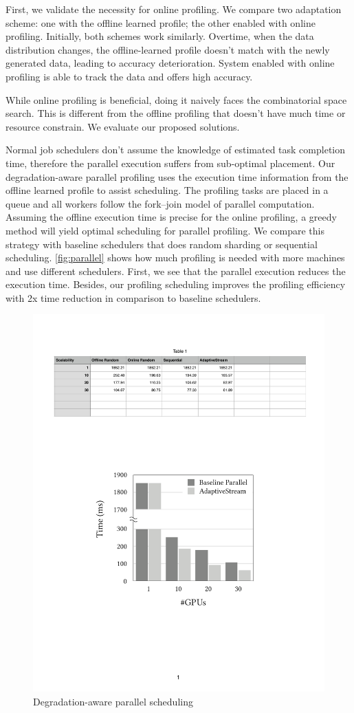 First, we validate the necessity for online profiling. We compare two adaptation
scheme: one with the offline learned profile; the other enabled with online
profiling. Initially, both schemes work similarly. Overtime, when the data
distribution changes, the offline-learned profile doesn't match with the newly
generated data, leading to accuracy deterioration. System enabled with online
profiling is able to track the data and offers high accuracy.

While online profiling is beneficial, doing it naively faces the combinatorial
space search. This is different from the offline profiling that doesn't have
much time or resource constrain. We evaluate our proposed solutions.

 Normal job schedulers don't assume
the knowledge of estimated task completion time, therefore the parallel
execution suffers from sub-optimal placement. Our degradation-aware parallel
profiling uses the execution time information from the offline learned profile
to assist scheduling. The profiling tasks are placed in a queue and all workers
follow the fork–join model of parallel computation. Assuming the offline
execution time is precise for the online profiling, a greedy method will yield
optimal scheduling for parallel profiling. We compare this strategy with
baseline schedulers that does random sharding or sequential scheduling.
\autoref{fig:parallel} shows how much profiling is needed with more machines and
use different schedulers. First, we see that the parallel execution reduces the
execution time. Besides, our profiling scheduling improves the profiling
efficiency with 2x time reduction in comparison to baseline schedulers.

\begin{figure}
  \centering
  \includegraphics[width=0.8\columnwidth]{figures/parallel.pdf}
  \caption{Degradation-aware parallel scheduling}
  \label{fig:parallel}
\end{figure}

